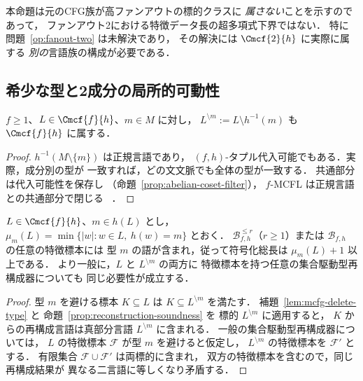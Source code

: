 \begin{remark}
本命題は元のCFG族が高ファンアウトの標的クラスに
\emph{属さない}ことを示すのであって，
ファンアウト2における特徴データ長の超多項式下界ではない．
特に問題~\ref{op:fanout-two} は未解決であり，
その解決には $\Cmcf{2}{h}$ に実際に属する
\emph{別の}言語族の構成が必要である．
\end{remark}



\subsection{希少な型と2成分の局所的可動性}
\label{subsec:rare-type-mobility}

\begin{lemma}[$h$ の型全体の削除]
\label{lem:mcfg-delete-type}
$f\ge1$、$L\in\Cmcf{f}{h}$、$m\in M$ に対し，
$L^{\setminus m}:=L\setminus h^{-1}(m)$ も
$\Cmcf{f}{h}$ に属する．
\end{lemma}
\begin{proof}
$h^{-1}(M\setminus\{m\})$ は正規言語であり，
$(f,h)$-タプル代入可能でもある．実際，成分別の型が
一致すれば，どの文文脈でも全体の型が一致する．
共通部分は代入可能性を保存し
（命題~\ref{prop:abelian-coset-filter}），
$f$-MCFL は正規言語との共通部分で閉じる
~\cite{SekiEtAl1991}．
\end{proof}

\begin{proposition}[希少な型は長い正例を強制する]
\label{prop:mcfg-rare-type-sample}
$L\in\Cmcf{f}{h}$、$m\in h(L)$ とし，
$\mu_m(L)=\min\{|w|:w\in L,\ h(w)=m\}$ とおく．
$\mathcal B^{\le r}_{f,h}$（$r\ge1$）または
$\mathcal B_{f,h}$ の任意の特徴標本には
型 $m$ の語が含まれ，従って符号化総長は
$\mu_m(L)+1$ 以上である．
より一般に，$L$ と $L^{\setminus m}$ の両方に
特徴標本を持つ任意の集合駆動型再構成器についても
同じ必要性が成立する．
\end{proposition}
\begin{proof}
型 $m$ を避ける標本 $K\subseteq L$ は
$K\subseteq L^{\setminus m}$ を満たす．
補題~\ref{lem:mcfg-delete-type} と
命題~\ref{prop:reconstruction-soundness} を
標的 $L^{\setminus m}$ に適用すると，
$K$ からの再構成言語は真部分言語
$L^{\setminus m}$ に含まれる．
一般の集合駆動型再構成器については，
$L$ の特徴標本 $\mathcal F$ が型 $m$ を避けると仮定し，
$L^{\setminus m}$ の特徴標本を $\mathcal F'$ とする．
有限集合 $\mathcal F\cup\mathcal F'$ は両標的に含まれ，
双方の特徴標本を含むので，同じ再構成結果が
異なる二言語に等しくなり矛盾する．
\end{proof}

